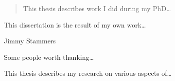 
\begin{abstract}
        This thesis describes work I did during my PhD\ldots
\end{abstract}

\begin{declaration}
This dissertation is the result of my own work\ldots
        \vspace*{1cm}
        \begin{flushright}
        Jimmy Stammers
        \end{flushright}
    \end{declaration}

    \begin{acknowledgements}
        Some people worth thanking\ldots
    \end{acknowledgements}

    \begin{preface}
        This thesis describes my research on various aspects of\ldots
    \end{preface}


    \tableofcontents
    \listoffigures
    \listoftables